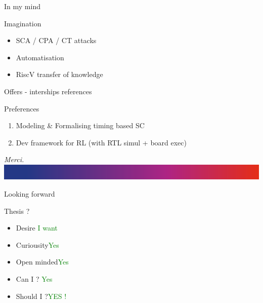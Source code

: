 \documentclass[hyperref={bookmarks=false},aspectratio=169]{beamer}
\begin{document}
\begin{frame}{In my mind}
  \begin{block}{Imagination}
    \begin{itemize}
      \item SCA / CPA / CT attacks
      \item Automatisation
      \item RiscV transfer of knowledge
    \end{itemize}
  \end{block}
\end{frame}

\begin{frame}{Offers - interships references}
  
  \begin{block}{Preferences}
    \begin{enumerate}
      \item Modeling \& Formalising timing based SC
      \item Dev framework for RL (with RTL simul + board exec)
    \end{enumerate}
  \end{block}
\end{frame}


\begin{frame}
  \begin{center}
    \Huge 
    \textit{\textcolor{Night_blue}{ Merci.}}\\
    \includegraphics[scale=0.2]{img/Filet-7pt.png}
  \end{center}
\end{frame}


\begin{frame}{Looking forward}
  
  \begin{block}{Thesis ?}
    \begin{itemize}
      \item Desire \dotfill \textcolor{Green}{I want}
      \item Curiousity\dotfill\textcolor{Green}{Yes}
      \item Open minded\dotfill \textcolor{Green}{Yes}
      \item Can I ? \dotfill \textcolor{Green}{Yes}
    \end{itemize}
    \begin{itemize}
      \item Should I ?\dotfill \textcolor{Green}{YES !}
    \end{itemize}
  \end{block}
\end{frame}




\end{document}

